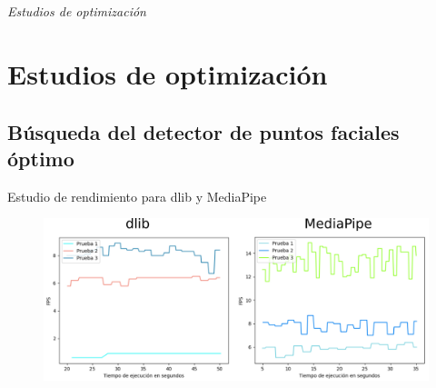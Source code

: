 \documentclass{beamer}
\begin{document}
\section*{}
\begin{frame}{}
  \centering \Huge
  \emph{Estudios de optimización}
\end{frame}

\section{Estudios de optimización}
\subsection{Búsqueda del detector de puntos faciales óptimo}
\begin{frame}{Estudio de rendimiento para dlib y MediaPipe}
\begin{figure}[h!]
  \begin{center}
    \includegraphics[width=12cm]{figs/pruebas_rendimiento_puntos.png}
  \end{center}
\end{figure}
\end{frame}
\end{document}
